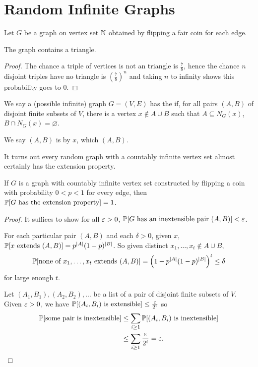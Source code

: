 \documentclass[main.tex]{subfiles}
\begin{document}
\section{Random Infinite Graphs}%
Let $G$ be a graph on vertex set $\mathbb N$
obtained by flipping a fair coin for each edge.
\begin{fact*}
  The graph contains a triangle.
\end{fact*}
\begin{proof}
  The chance a triple of vertices is not an triangle is $\frac 7 8$,
  hence the chance $n$ disjoint triples have no triangle is
  $\left(\frac 7 8\right)^n$ and taking $n$ to infinity shows this probability
  goes to 0.
\end{proof}
\begin{definition*}
  We say a (possible infinite) graph $G = (V, E)$ has the
   if, for all pairs $(A, B)$ of disjoint finite
  subsets of $V$, there is a vertex $x\notin A\cup B$ such that
  $A\subseteq N_G(x)$, $B\cap N_G(x) = \varnothing$.

  We say $(A,B)$ is  by $x$, which  $(A,B)$.
\end{definition*}
It turns out every random graph with a countably infinite vertex set almost
certainly has the extension property.
\begin{proposition*}
  If $G$ is a graph with countably infinite vertex set constructed by flipping
  a coin with probability $0 < p < 1$ for every edge,
  then $\mathbb P[G\text{ has the extension property}] = 1$.
\end{proposition*}
\begin{proof}
  It suffices to show for all $\varepsilon > 0$,
  $\mathbb P[G\text{ has an inextensible pair }(A, B)] < \varepsilon$.

  For each particular pair $(A, B)$ and each $\delta > 0$, given $x$,
  $\mathbb P[x\text{ extends }(A,B)] = p^{|A|}(1-p)^{|B|}$.
  So given distinct $x_1,\ldots,x_t\notin A\cup B$,
  \[
    \mathbb P[\text{none of }x_1,\ldots,x_t\text{ extends }(A,B)]
    = \left(1 - p^{|A|}(1-p)^{|B|}\right)^t\leq\delta
  \]
  for large enough $t$.

  Let $(A_1, B_1), (A_2,B_2), \ldots$ be a list of a pair of disjoint finite
  subsets of $V$.
  Given $\varepsilon > 0$, we have $\mathbb P[(A_i,B_i)\text{ is extensible}]\leq\frac{\varepsilon}{2^i}$
  so
  \begin{align*}
    \mathbb P[\text{some pair is inextensible}]
    &\leq\sum_{i\geq 1}\mathbb P[(A_i,B_i)\text{ is inextensible}] \\
    &\leq\sum_{i\geq 1}\frac{\varepsilon}{2^i} = \varepsilon. \qedhere
  \end{align*}
\end{proof}
\end{document}
